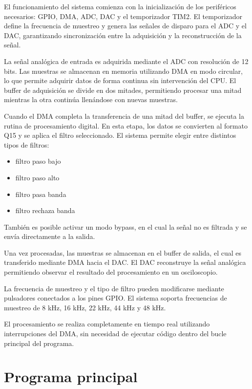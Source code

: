 \documentclass[12pt]{article}
\begin{document}
	El funcionamiento del sistema comienza con la inicialización de los periféricos necesarios: GPIO, DMA, ADC, DAC y el temporizador TIM2. El temporizador define la frecuencia de muestreo y genera las señales de disparo para el ADC y el DAC, garantizando sincronización entre la adquisición y la reconstrucción de la señal.

	La señal analógica de entrada es adquirida mediante el ADC con resolución de 12 bits. Las muestras se almacenan en memoria utilizando DMA en modo circular, lo que permite adquirir datos de forma continua sin intervención del CPU. El buffer de adquisición se divide en dos mitades, permitiendo procesar una mitad mientras la otra continúa llenándose con nuevas muestras.

	Cuando el DMA completa la transferencia de una mitad del buffer, se ejecuta la rutina de procesamiento digital. En esta etapa, los datos se convierten al formato Q15 y se aplica el filtro seleccionado. El sistema permite elegir entre distintos tipos de filtros:

	\begin{itemize}
	\item filtro paso bajo
	\item filtro paso alto
	\item filtro pasa banda
	\item filtro rechaza banda
	\end{itemize}

	También es posible activar un modo bypass, en el cual la señal no es filtrada y se envía directamente a la salida.

	Una vez procesadas, las muestras se almacenan en el buffer de salida, el cual es transferido mediante DMA hacia el DAC. El DAC reconstruye la señal analógica permitiendo observar el resultado del procesamiento en un osciloscopio.

	La frecuencia de muestreo y el tipo de filtro pueden modificarse mediante pulsadores conectados a los pines GPIO. El sistema soporta frecuencias de muestreo de 8 kHz, 16 kHz, 22 kHz, 44 kHz y 48 kHz.

	El procesamiento se realiza completamente en tiempo real utilizando interrupciones del DMA, sin necesidad de ejecutar código dentro del bucle principal del programa.

	\section{Programa principal}
\end{document}
